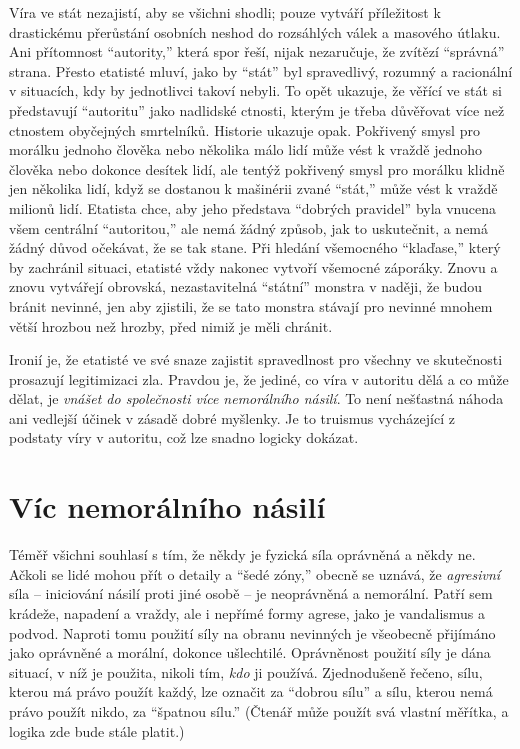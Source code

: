 \documentclass{book}
\begin{document}
Víra ve stát nezajistí, aby se všichni shodli; pouze vytváří příležitost k drastickému přerůstání osobních neshod do rozsáhlých válek a masového útlaku. Ani přítomnost \enquote{autority,} která spor řeší, nijak nezaručuje, že zvítězí \enquote{správná} strana. Přesto etatisté mluví, jako by \enquote{stát} byl spravedlivý, rozumný a racionální v situacích, kdy by jednotlivci takoví nebyli. To opět ukazuje, že věřící ve stát si představují \enquote{autoritu} jako nadlidské ctnosti, kterým je třeba důvěřovat více než ctnostem obyčejných smrtelníků. Historie ukazuje opak. Pokřivený smysl pro morálku jednoho člověka nebo několika málo lidí může vést k vraždě jednoho člověka nebo dokonce desítek lidí, ale tentýž pokřivený smysl pro morálku klidně jen několika lidí, když se dostanou k mašinérii zvané \enquote{stát,} může vést k vraždě milionů lidí. Etatista chce, aby jeho představa \enquote{dobrých pravidel} byla vnucena všem centrální \enquote{autoritou,} ale nemá žádný způsob, jak to uskutečnit, a nemá žádný důvod očekávat, že se tak stane. Při hledání všemocného \enquote{klaďase,} který by zachránil situaci, etatisté vždy nakonec vytvoří všemocné záporáky. Znovu a znovu vytvářejí obrovská, nezastavitelná \enquote{státní} monstra v naději, že budou bránit nevinné, jen aby zjistili, že se tato monstra stávají pro nevinné mnohem větší hrozbou než hrozby, před nimiž je měli chránit.

Ironií je, že etatisté ve své snaze zajistit spravedlnost pro všechny ve skutečnosti prosazují legitimizaci zla. Pravdou je, že jediné, co víra v autoritu dělá a co může dělat, je \emph{vnášet do společnosti více nemorálního násilí}. To není nešťastná náhoda ani vedlejší účinek v zásadě dobré myšlenky. Je to truismus vycházející z podstaty víry v autoritu, což lze snadno logicky dokázat.

\section{Víc nemorálního násilí}

Téměř všichni souhlasí s tím, že někdy je fyzická síla oprávněná a někdy ne. Ačkoli se lidé mohou přít o detaily a \enquote{šedé zóny,} obecně se uznává, že \emph{agresivní} síla -- iniciování násilí proti jiné osobě -- je neoprávněná a nemorální. Patří sem krádeže, napadení a vraždy, ale i nepřímé formy agrese, jako je vandalismus a podvod. Naproti tomu použití síly na obranu nevinných je všeobecně přijímáno jako oprávněné a morální, dokonce ušlechtilé. Oprávněnost použití síly je dána situací, v níž je použita, nikoli tím, \emph{kdo} ji používá. Zjednodušeně řečeno, sílu, kterou má právo použít každý, lze označit za \enquote{dobrou sílu} a sílu, kterou nemá právo použít nikdo, za \enquote{špatnou sílu.} (Čtenář může použít svá vlastní měřítka, a logika zde bude stále platit.)
\end{document}

